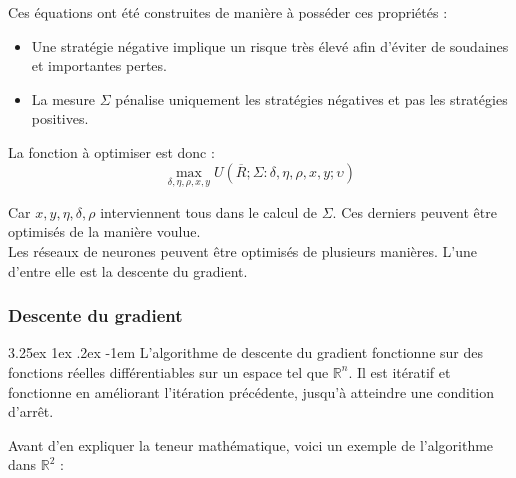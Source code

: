 \documentclass[a4paper, 11pt]{article}
\makeatletter
\renewcommand\paragraph{\@startsection{paragraph}{5}{\z@}%
  {3.25ex \@plus1ex \@minus.2ex}%
  {-1em}%
  {\normalfont\normalsize\bfseries}}
\makeatother
\begin{document}
Ces équations ont été construites de manière à posséder ces propriétés \cite{fx_trading}:
\begin{itemize}
 \item Une stratégie négative implique un risque très élevé afin d'éviter de soudaines et importantes pertes.
 
 \item La mesure $\Sigma$ pénalise uniquement les stratégies négatives et pas les stratégies positives. 
\end{itemize}

La fonction à optimiser est donc :
$$\max_{\delta, \eta, \rho, x, y} U(\overline{R};\Sigma: \delta, \eta, \rho, x, y; \upsilon)$$

Car $x,y,\eta,\delta,\rho$ interviennent tous dans le calcul de $\Sigma$. Ces derniers peuvent être optimisés de la manière voulue.
\\
Les réseaux de neurones peuvent être optimisés de plusieurs manières. L'une d'entre elle est la descente du gradient.

\subsubsection{Descente du gradient}\label{section descente du gradient}
\paragraph{}
L'algorithme de descente du gradient fonctionne sur des fonctions réelles différentiables sur un espace tel
que $\mathbb{R}^n$. Il est itératif et fonctionne en améliorant l'itération précédente, jusqu'à
atteindre une condition d'arrêt.

Avant d'en expliquer la teneur mathématique, voici un exemple de l'algorithme dans $\mathbb{R}^2$ :
\end{document}
